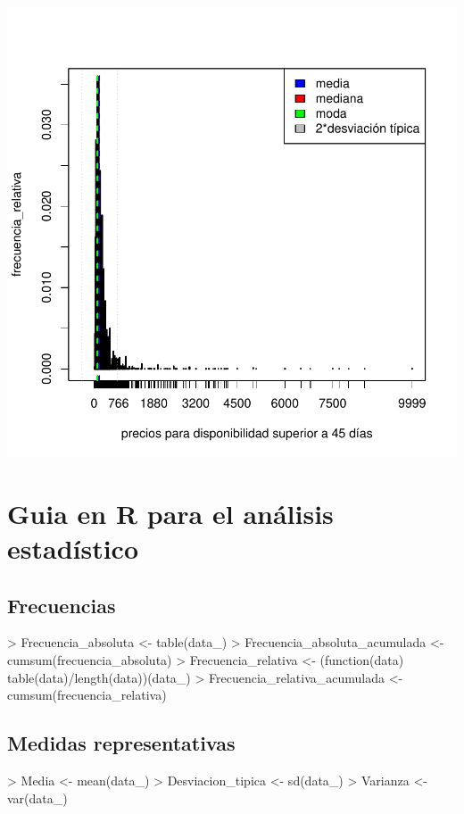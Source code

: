 \documentclass [a4paper] {article}
\begin{document}
\includegraphics{entrega-disponibilidad_alta_por_barrios_precio}

\newpage
\section{Guia en R para el análisis estadístico}
\subsection{Frecuencias}
\begin{Schunk}
\begin{Sinput}
> Frecuencia_absoluta <- table(data_)
> Frecuencia_absoluta_acumulada <- cumsum(frecuencia_absoluta)
> Frecuencia_relativa <- (function(data) table(data)/length(data))(data_)
> Frecuencia_relativa_acumulada <- cumsum(frecuencia_relativa)
\end{Sinput}
\end{Schunk}
\subsection{Medidas representativas}
\begin{Schunk}
\begin{Sinput}
> Media <- mean(data_)
> Desviacion_tipica <- sd(data_)
> Varianza <- var(data_)
\end{Sinput}
\end{Schunk}
\end{document}
